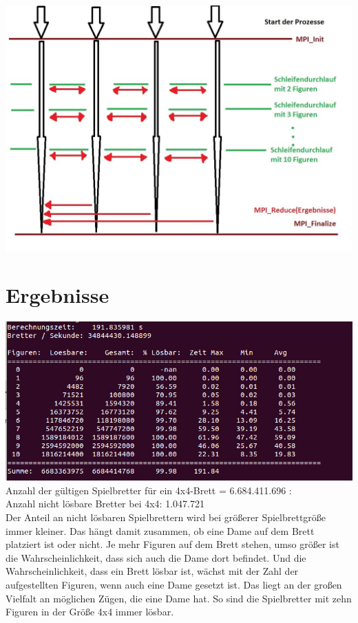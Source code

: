 \documentclass[
	12pt,
	a4paper,
	BCOR10mm,
	DIV14,
	listof=totoc,
	bibliography=totoc,
	headsepline
]{scrreprt}
\begin{document}
\includegraphics[scale=0.5]{MPI_Kommunikation}


\chapter{Ergebnisse}
\label{Ergebnisse}

\includegraphics[scale=0.6]{output}
\newline
\newline
Anzahl der gültigen Spielbretter für ein 4x4-Brett = 6.684.411.696 :\\
Anzahl nicht lösbare Bretter bei 4x4: 1.047.721\\

Der Anteil an nicht lösbaren Spielbrettern wird bei größerer Spielbrettgröße immer kleiner. Das hängt damit zusammen, ob eine Dame auf dem Brett platziert ist oder nicht. Je mehr Figuren auf dem Brett stehen, umso größer ist die Wahrscheinlichkeit, dass sich auch die Dame dort befindet. Und die Wahrscheinlichkeit, dass ein Brett lösbar ist, wächst mit der Zahl der aufgestellten Figuren, wenn auch eine Dame gesetzt ist. 
Das liegt an der großen Vielfalt an möglichen Zügen, die eine Dame hat.
So sind die Spielbretter mit zehn Figuren in der Größe 4x4 immer lösbar.
\end{document}

